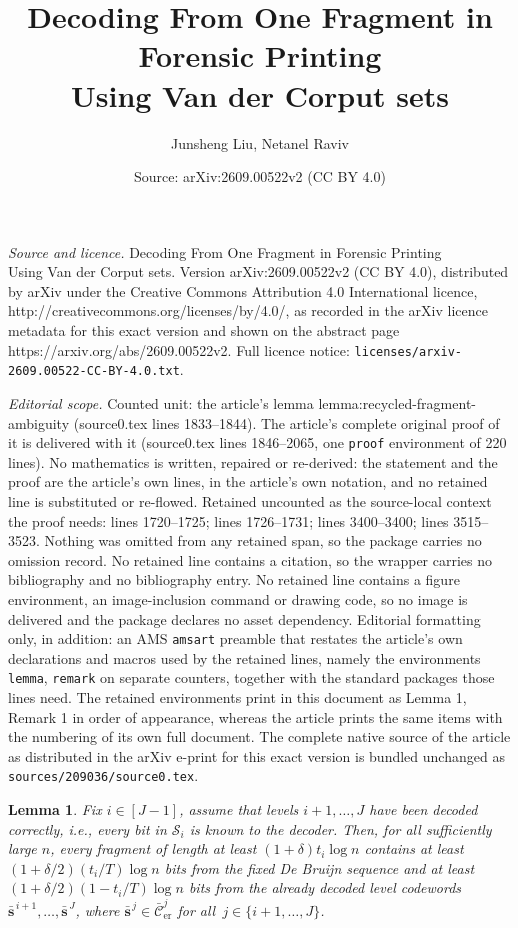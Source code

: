 \documentclass[10pt,a4paper]{amsart}
\title{Decoding From One Fragment in Forensic Printing\\Using Van der Corput sets}
\author{Junsheng Liu, Netanel Raviv}
\date{Source: arXiv:2609.00522v2 (CC BY 4.0)}
\newtheorem{lemma}{Lemma}
\newcommand{\bolds}{\mathbf{s}}
\newcommand{\cC}{\mathcal{C}}
\newcommand{\cS}{\mathcal{S}}
\begin{document}
\maketitle

\noindent\emph{Source and licence.} Decoding From One Fragment in Forensic Printing\\Using Van der Corput sets. Version arXiv:2609.00522v2 (CC BY 4.0), distributed by arXiv under the Creative Commons Attribution 4.0 International licence, http://creativecommons.org/licenses/by/4.0/, as recorded in the arXiv licence metadata for this exact version and shown on the abstract page https://arxiv.org/abs/2609.00522v2. Full licence notice: \texttt{licenses/arxiv-2609.00522-CC-BY-4.0.txt}.\par\smallskip

\noindent\textit{Editorial scope.} Counted unit: the article's lemma lemma:recycled-fragment-ambiguity (source0.tex lines 1833--1844). The article's complete original proof of it is delivered with it (source0.tex lines 1846--2065, one \texttt{proof} environment of 220 lines). No mathematics is written, repaired or re-derived: the statement and the proof are the article's own lines, in the article's own notation, and no retained line is substituted or re-flowed.  Retained uncounted as the source-local context the proof needs: lines 1720--1725; lines 1726--1731; lines 3400--3400; lines 3515--3523.  Nothing was omitted from any retained span, so the package carries no omission record.  No retained line contains a citation, so the wrapper carries no bibliography and no bibliography entry.  No retained line contains a figure environment, an image-inclusion command or drawing code, so no image is delivered and the package declares no asset dependency.  Editorial formatting only, in addition: an AMS \texttt{amsart} preamble that restates the article's own declarations and macros used by the retained lines, namely the environments \texttt{lemma}, \texttt{remark} on separate counters, together with the standard packages those lines need.  The retained environments print in this document as Lemma 1, Remark 1 in order of appearance, whereas the article prints the same items with the numbering of its own full document.  The complete native source of the article as distributed in the arXiv e-print for this exact version is bundled unchanged as \texttt{sources/209036/source0.tex}.
\begin{lemma}\label{lemma:usable-level-signature}
Fix $i\in[J-1]$, assume that levels $i+1,\ldots,J$ have been decoded correctly, i.e., every bit in $\cS_i$ is known to the decoder.
Then, for all sufficiently large $n$, every fragment of length at least
$(1+\delta)t_i\log n$ contains at least $(1+\delta/2)(t_i/T)\log n$ bits from the fixed De Bruijn sequence and at least $(1+\delta/2)(1-t_i/T)\log n$ bits from the already decoded level codewords $\bar{\bolds}^{\,i+1},\ldots,\bar{\bolds}^{\,J}$, where
$\bar{\bolds}^{\,j}\in\bar{\cC}_{\mathrm{er}}^j$ for all~$j\in\{i+1,\ldots,J\}$.
\end{lemma}
\end{document}
